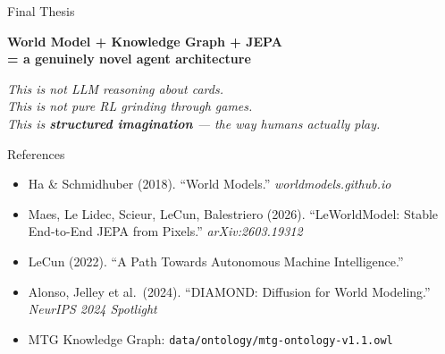 \documentclass[aspectratio=169, 11pt]{beamer}
\begin{document}
\begin{frame}{Final Thesis}
  \begin{center}
    \large\bfseries World Model + Knowledge Graph + JEPA\\
    = a genuinely novel agent architecture
  \end{center}
  \vspace{0.3cm}
  \begin{center}
  \end{center}
  \vspace{0.4cm}
  \begin{center}
    \textit{This is not LLM reasoning about cards.\\
    This is not pure RL grinding through games.\\
    This is \textbf{structured imagination} --- the way humans actually play.}
  \end{center}
\end{frame}

\begin{frame}{References}
  \footnotesize
  \begin{itemize}
    \item Ha \& Schmidhuber (2018). ``World Models.''
          \textit{worldmodels.github.io}
    \item Maes, Le Lidec, Scieur, LeCun, Balestriero (2026).
          ``LeWorldModel: Stable End-to-End JEPA from Pixels.''
          \textit{arXiv:2603.19312}
    \item LeCun (2022). ``A Path Towards Autonomous Machine Intelligence.''
    \item Alonso, Jelley et al.\ (2024). ``DIAMOND: Diffusion for World
          Modeling.'' \textit{NeurIPS 2024 Spotlight}
    \item MTG Knowledge Graph:
          \texttt{data/ontology/mtg-ontology-v1.1.owl}
  \end{itemize}
\end{frame}
\end{document}
